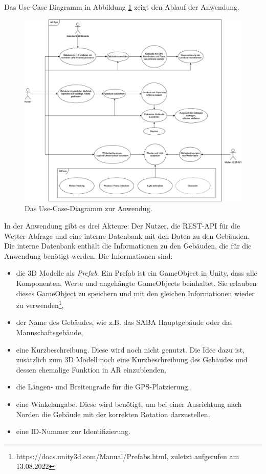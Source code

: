 Das Use-Case Diagramm in Abbildung \ref*{fig:konzept-use-case-diagramm} zeigt den Ablauf der Anwendung.

\begin{figure}[H]
    \centering
    \includegraphics[width=\textwidth]{img/anwendung/UseCaseDiagrammVillingenAR.jpg}
    \caption[Das Use-Case-Diagramm zur Anwendug.]{Das Use-Case-Diagramm zur Anwendug.\protect\footnotemark}
    \label{fig:konzept-use-case-diagramm}
\end{figure}

In der Anwendung gibt es drei Akteure: Der Nutzer, die REST-API für die Wetter-Abfrage und eine interne Datenbank mit den Daten zu den Gebäuden. Die interne Datenbank enthält die Informationen zu den Gebäuden, die für die Anwendung benötigt werden. Die Informationen sind:
\begin{itemize}
    \item die 3D Modelle als \textit{Prefab}. Ein Prefab ist ein GameObject in Unity, dass alle Komponenten, Werte und angehängte GameObjects beinhaltet. Sie erlauben dieses GameObject zu speichern und mit den gleichen Informationen wieder zu verwenden\footnote{https://docs.unity3d.com/Manual/Prefabs.html, zuletzt aufgerufen am 13.08.2022},
    \item der Name des Gebäudes, wie z.B. das SABA Hauptgebäude oder das Mannschaftsgebäude,
    \item eine Kurzbeschreibung. Diese wird noch nicht genutzt. Die Idee dazu ist, zusätzlich zum 3D Modell noch eine Kurzbeschreibung des Gebäudes und dessen ehemalige Funktion in AR einzublenden,
    \item die Längen- und Breitengrade für die GPS-Platzierung,
    \item eine Winkelangabe. Diese wird benötigt, um bei einer Ausrichtung nach Norden die Gebäude mit der korrekten Rotation darzustellen,
    \item eine ID-Nummer zur Identifizierung.
\end{itemize}


